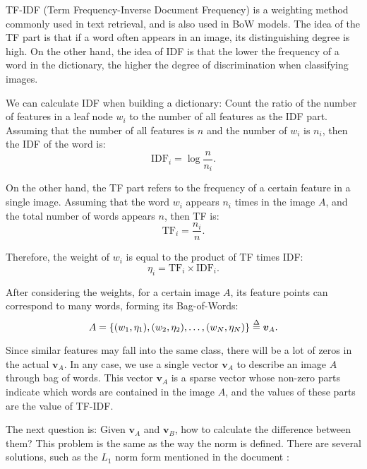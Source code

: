 TF-IDF (Term Frequency-Inverse Document Frequency)\textsuperscript{\cite{Sivic2003, Robertson2004}} is a weighting method commonly used in text retrieval, and is also used in BoW models. The idea of the TF part is that if a word often appears in an image, its distinguishing degree is high. On the other hand, the idea of IDF is that the lower the frequency of a word in the dictionary, the higher the degree of discrimination when classifying images.

We can calculate IDF when building a dictionary: Count the ratio of the number of features in a leaf node $w_i$ to the number of all features as the IDF part. Assuming that the number of all features is $n$ and the number of $w_i$ is $n_i$, then the IDF of the word is:
\begin{equation}
	\mathrm{IDF}_i = \log \frac{n}{n_i}.
\end{equation}

On the other hand, the TF part refers to the frequency of a certain feature in a single image. Assuming that the word $w_i$ appears $n_i$ times in the image $A$, and the total number of words appears $n$, then TF is:
\begin{equation}
	\mathrm{TF}_i = \frac{n_i}{n}.
\end{equation}

Therefore, the weight of $w_i$ is equal to the product of TF times IDF:
\begin{equation}
	\eta_i = \mathrm{TF}_i \times \mathrm{IDF}_i.
\end{equation}

After considering the weights, for a certain image $A$, its feature points can correspond to many words, forming its Bag-of-Words:
\begin{equation}
	A = \left\{ (w_1, \eta_1), (w_2, \eta_2), \ldots, (w_N, \eta_N)  \right\} \buildrel \Delta \over = \bm{v}_A.
\end{equation}

Since similar features may fall into the same class, there will be a lot of zeros in the actual $\bm{v}_A$. In any case, we use a single vector $\bm{v}_A$ to describe an image $A$ through bag of words. This vector $\bm{v}_A$ is a sparse vector whose non-zero parts indicate which words are contained in the image $A$, and the values of these parts are the value of TF-IDF.

The next question is: Given $\bm{v}_A$ and $\bm{v}_B$, how to calculate the difference between them? This problem is the same as the way the norm is defined. There are several solutions, such as the $L_1$ norm form mentioned in the document \cite{Nister2006}:

